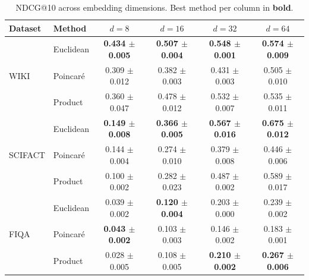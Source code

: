 \begin{table}[t]
\caption{NDCG@10 across embedding dimensions. Best method per column in \textbf{bold}.}
\label{tab:dimension_sweep}
\centering
\small
\begin{tabular}{llcccc}
\toprule
Dataset & Method & $d=8$ & $d=16$ & $d=32$ & $d=64$ \\
\midrule
\multirow{3}{*}{WIKI} & Euclidean & \textbf{0.434 {\scriptsize$\pm$0.005}} & \textbf{0.507 {\scriptsize$\pm$0.004}} & \textbf{0.548 {\scriptsize$\pm$0.001}} & \textbf{0.574 {\scriptsize$\pm$0.009}} \\
 & Poincar\'e & 0.309 {\scriptsize$\pm$0.012} & 0.382 {\scriptsize$\pm$0.003} & 0.431 {\scriptsize$\pm$0.003} & 0.505 {\scriptsize$\pm$0.010} \\
 & Product & 0.360 {\scriptsize$\pm$0.047} & 0.478 {\scriptsize$\pm$0.012} & 0.532 {\scriptsize$\pm$0.007} & 0.535 {\scriptsize$\pm$0.011} \\
\midrule
\multirow{3}{*}{SCIFACT} & Euclidean & \textbf{0.149 {\scriptsize$\pm$0.008}} & \textbf{0.366 {\scriptsize$\pm$0.005}} & \textbf{0.567 {\scriptsize$\pm$0.016}} & \textbf{0.675 {\scriptsize$\pm$0.012}} \\
 & Poincar\'e & 0.144 {\scriptsize$\pm$0.004} & 0.274 {\scriptsize$\pm$0.010} & 0.379 {\scriptsize$\pm$0.008} & 0.446 {\scriptsize$\pm$0.006} \\
 & Product & 0.100 {\scriptsize$\pm$0.002} & 0.282 {\scriptsize$\pm$0.023} & 0.487 {\scriptsize$\pm$0.002} & 0.589 {\scriptsize$\pm$0.017} \\
\midrule
\multirow{3}{*}{FIQA} & Euclidean & 0.039 {\scriptsize$\pm$0.002} & \textbf{0.120 {\scriptsize$\pm$0.004}} & 0.203 {\scriptsize$\pm$0.000} & 0.239 {\scriptsize$\pm$0.002} \\
 & Poincar\'e & \textbf{0.043 {\scriptsize$\pm$0.002}} & 0.103 {\scriptsize$\pm$0.003} & 0.146 {\scriptsize$\pm$0.002} & 0.183 {\scriptsize$\pm$0.001} \\
 & Product & 0.028 {\scriptsize$\pm$0.005} & 0.108 {\scriptsize$\pm$0.005} & \textbf{0.210 {\scriptsize$\pm$0.002}} & \textbf{0.267 {\scriptsize$\pm$0.006}} \\
\bottomrule
\end{tabular}
\end{table}